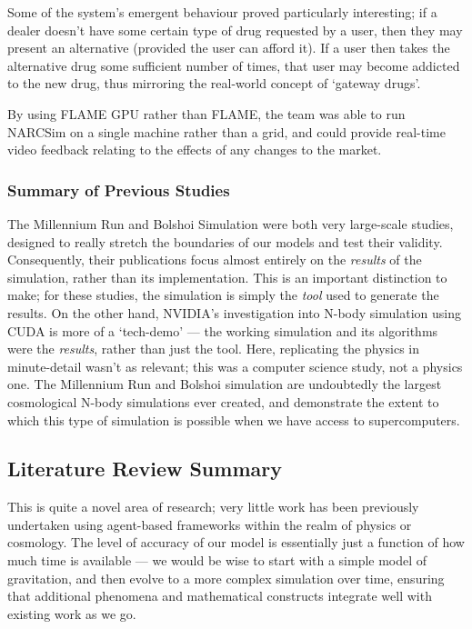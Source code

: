 \documentclass[11pt,a4paper]{article}
\begin{document}
Some of the system's emergent behaviour proved particularly interesting; if a dealer doesn't have some certain type of drug requested by a user, then they may present an alternative (provided the user can afford it). If a user then takes the alternative drug some sufficient number of times, that user may become addicted to the new drug, thus mirroring the real-world concept of `gateway drugs'.

 By using FLAME GPU rather than FLAME, the team was able to run NARCSim on a single machine rather than a grid, and could provide real-time video feedback relating to the effects of any changes to the market.

\subsubsection{Summary of Previous Studies}

The Millennium Run and Bolshoi Simulation were both very large-scale studies, designed to really stretch the boundaries of our models and test their validity. Consequently, their publications focus almost entirely on the \emph{results} of the simulation, rather than its implementation. This is an important distinction to make; for these studies, the simulation is simply the \emph{tool} used to generate the results. On the other hand, NVIDIA's investigation into N-body simulation using CUDA is more of a `tech-demo' --- the working simulation and its algorithms were the \emph{results}, rather than just the tool. Here, replicating the physics in minute-detail wasn't as relevant; this was a computer science study, not a physics one. The Millennium Run and Bolshoi simulation are undoubtedly the largest cosmological N-body simulations ever created, and demonstrate the extent to which this type of simulation is possible when we have access to supercomputers.

\subsection{Literature Review Summary}
This is quite a novel area of research; very little work has been previously undertaken using agent-based frameworks within the realm of physics or cosmology. The level of accuracy of our model is essentially just a function of how much time is available --- we would be wise to start with a simple model of gravitation, and then evolve to a more complex simulation over time, ensuring that additional phenomena and mathematical constructs integrate well with existing work as we go.
\end{document}
